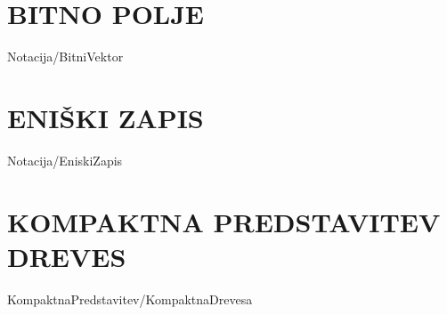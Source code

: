 \section{BITNO POLJE}\label{sec:Bitno_Polje}
{Notacija/BitniVektor}

\section{ENIŠKI ZAPIS}\label{sec:Eniski_Zapis}
{Notacija/EniskiZapis}

\section{KOMPAKTNA PREDSTAVITEV DREVES}\label{sec:kompaktna_drevesa}
{KompaktnaPredstavitev/KompaktnaDrevesa}